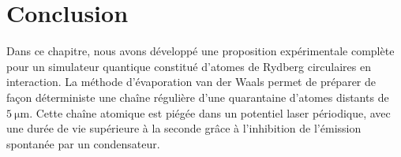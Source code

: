 %
%
%

\clearpage
\section*{Conclusion}
\noindent Dans ce chapitre, nous avons développé une proposition expérimentale complète pour un simulateur quantique constitué d'atomes de Rydberg circulaires en interaction.
La méthode d'\og évaporation van der Waals \fg{} permet de préparer de façon déterministe une chaîne régulière d'une quarantaine d'atomes distants de $\SI{5}{\um}$.
Cette chaîne atomique est piégée dans un potentiel laser périodique, avec une durée de vie supérieure à la seconde grâce à l'inhibition de l'émission spontanée par un condensateur.

